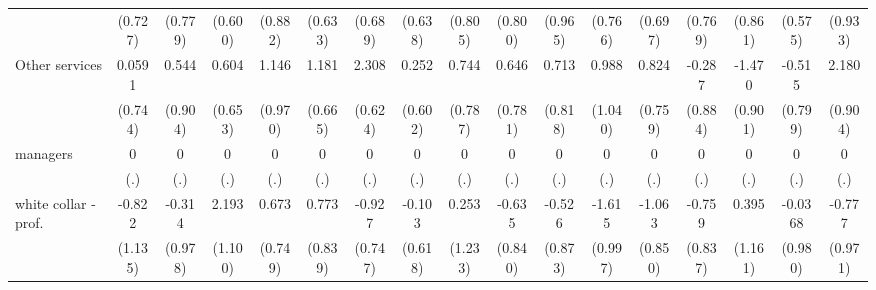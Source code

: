 {\begin{tabular}{l*{16}{c}}
                    &     (0.727)         &     (0.779)         &     (0.600)         &     (0.882)         &     (0.633)         &     (0.689)         &     (0.638)         &     (0.805)         &     (0.800)         &     (0.965)         &     (0.766)         &     (0.697)         &     (0.769)         &     (0.861)         &     (0.575)         &     (0.933)         \\
[1em]
Other services      &      0.0591         &       0.544         &       0.604         &       1.146         &       1.181         &       2.308\sym{***}&       0.252         &       0.744         &       0.646         &       0.713         &       0.988         &       0.824         &      -0.287         &      -1.470         &      -0.515         &       2.180\sym{*}  \\
                    &     (0.744)         &     (0.904)         &     (0.653)         &     (0.970)         &     (0.665)         &     (0.624)         &     (0.602)         &     (0.787)         &     (0.781)         &     (0.818)         &     (1.040)         &     (0.759)         &     (0.884)         &     (0.901)         &     (0.799)         &     (0.904)         \\
[1em]
managers            &           0         &           0         &           0         &           0         &           0         &           0         &           0         &           0         &           0         &           0         &           0         &           0         &           0         &           0         &           0         &           0         \\
                    &         (.)         &         (.)         &         (.)         &         (.)         &         (.)         &         (.)         &         (.)         &         (.)         &         (.)         &         (.)         &         (.)         &         (.)         &         (.)         &         (.)         &         (.)         &         (.)         \\
[1em]
white collar - prof.&      -0.822         &      -0.314         &       2.193\sym{*}  &       0.673         &       0.773         &      -0.927         &      -0.103         &       0.253         &      -0.635         &      -0.526         &      -1.615         &      -1.063         &      -0.759         &       0.395         &     -0.0368         &      -0.777         \\
                    &     (1.135)         &     (0.978)         &     (1.100)         &     (0.749)         &     (0.839)         &     (0.747)         &     (0.618)         &     (1.233)         &     (0.840)         &     (0.873)         &     (0.997)         &     (0.850)         &     (0.837)         &     (1.161)         &     (0.980)         &     (0.971)         \\

\end{tabular}}
